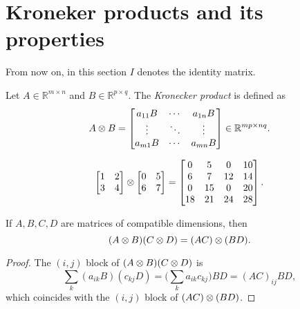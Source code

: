 \chapter{Kroneker products and its properties}

From now on, in this section $I$ denotes the identity matrix.

\begin{definition}
    Let $A \in \mathbb{R}^{m \times n}$ and $B \in \mathbb{R}^{p \times q}$. 
    The \emph{Kronecker product} is defined as
    \[
        A \otimes B = 
        \begin{bmatrix}
            a_{11}B & \cdots & a_{1n}B \\
            \vdots & \ddots & \vdots \\
            a_{m1}B & \cdots & a_{mn}B
        \end{bmatrix} \in \mathbb{R}^{mp \times nq}.
    \]
    \label{ch:krondef}
\end{definition}

\begin{example}
\[
    \begin{bmatrix}
        1 & 2 \\
        3 & 4
    \end{bmatrix}
    \otimes
    \begin{bmatrix}
        0 & 5 \\
        6 & 7
    \end{bmatrix} 
    =
    \begin{bmatrix}
        0 & 5 & 0 & 10 \\
        6 & 7 & 12 & 14 \\
        0 & 15 & 0 & 20 \\
        18 & 21 & 24 & 28
    \end{bmatrix}.
\]
\end{example}

\begin{proposition}
    If $A,B,C,D$ are matrices of compatible dimensions, then
    \[
        (A \otimes B)(C \otimes D) = (AC) \otimes (BD).
    \]
    \label{prop:prod}
\end{proposition}

\begin{proof}
    The $(i,j)$ block of $(A \otimes B)(C \otimes D)$ is
    \[
        \sum_k (a_{ik}B)(c_{kj}D) = \Big(\sum_k a_{ik}c_{kj}\Big) BD = (AC)_{ij}BD,
    \]
    which coincides with the $(i,j)$ block of $(AC) \otimes (BD)$.
\end{proof}


